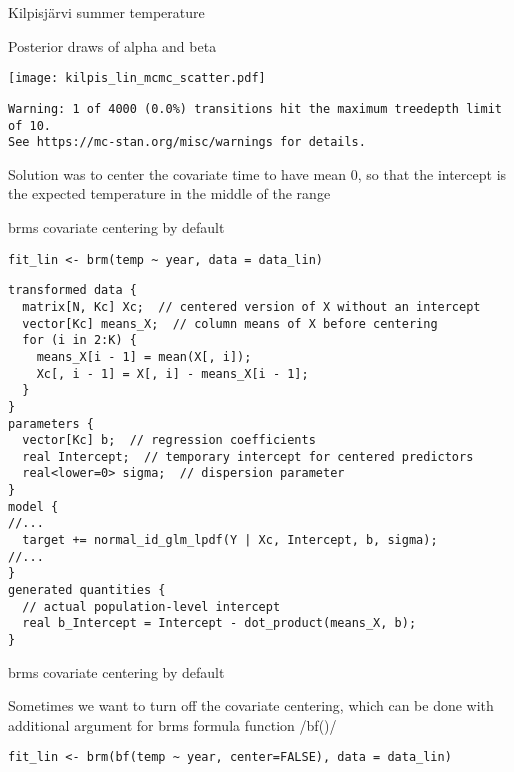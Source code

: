 \documentclass[finnish,english,t]{beamer}
\begin{document}
\begin{frame}[fragile]{Kilpisjärvi summer temperature}
  
  Posterior draws of alpha and beta
  
  \begin{center}
    \texttt{[image: kilpis\_lin\_mcmc\_scatter.pdf]}
  \end{center}

\scriptsize
\begin{verbatim}
Warning: 1 of 4000 (0.0%) transitions hit the maximum treedepth limit of 10.
See https://mc-stan.org/misc/warnings for details.
\end{verbatim}
\pause
\small
Solution was to center the covariate time to have mean 0, so that the
intercept is the expected temperature in the middle of the range
  
\end{frame}

\begin{frame}{brms covariate centering by default}

  \vspace{-0.75\baselineskip}
\begin{verbatim}
fit_lin <- brm(temp ~ year, data = data_lin)
\end{verbatim}
\pause
\begin{verbatim}
transformed data {
  matrix[N, Kc] Xc;  // centered version of X without an intercept
  vector[Kc] means_X;  // column means of X before centering
  for (i in 2:K) {
    means_X[i - 1] = mean(X[, i]);
    Xc[, i - 1] = X[, i] - means_X[i - 1];
  }
}
parameters {
  vector[Kc] b;  // regression coefficients
  real Intercept;  // temporary intercept for centered predictors
  real<lower=0> sigma;  // dispersion parameter
}
model {
//...
  target += normal_id_glm_lpdf(Y | Xc, Intercept, b, sigma);
//...
}
generated quantities {
  // actual population-level intercept
  real b_Intercept = Intercept - dot_product(means_X, b);
}
\end{verbatim}

\end{frame}

\begin{frame}{brms covariate centering by default}

  Sometimes we want to turn off the covariate centering, which can be
  done with additional argument for brms formula function
  \rinline/bf()/

\begin{verbatim}
fit_lin <- brm(bf(temp ~ year, center=FALSE), data = data_lin)
\end{verbatim}

\end{frame}
\end{document}

